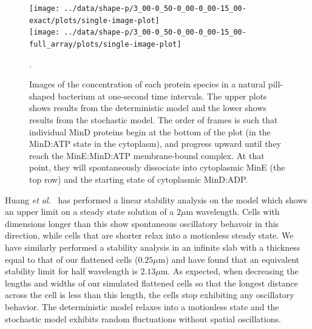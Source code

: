 \documentclass[letterpaper,twocolumn,amsmath,amssymb,pre]{revtex4-1}
\newcommand{\red}[1]{{\bf \color{red} #1}}
\newcommand{\fixme}[1]{\red{[#1]}}
\newcommand\micron{\ensuremath{\mu\text{m}}}
\begin{document}

\begin{figure}
  \begin{center}
    \texttt{[image: ../data/shape-p/3\_00-0\_50-0\_00-0\_00-15\_00-exact/plots/single-image-plot]}\\
    \vspace{-2.5em}
    \texttt{[image: ../data/shape-p/3\_00-0\_50-0\_00-0\_00-15\_00-full\_array/plots/single-image-plot]}
    \vspace{-3em}
  \end{center}
  \caption{Images of the concentration of each protein species in a
    natural pill-shaped bacterium at one-second time intervals. The
    upper plots shows results from the deterministic model and the
    lower shows results from the stochastic model.  The order of
    frames is such that individual MinD proteins begin at the bottom
    of the plot (in the MinD:ATP state in the cytoplasm), and progress
    upward until they reach the MinE:MinD:ATP membrane-bound complex.
    At that point, they will spontaneously dissociate into cytoplasmic
    MinE (the top row) and the starting state of cytoplasmic
    MinD:ADP.}.
  \label{image-p}
\end{figure}

Huang \emph{et al.}~\cite{huang2003dynamic} has performed a linear
stability analysis on the model which shows an upper limit on a steady
state solution of a $2\micron$ wavelength.  Cells with dimensions longer
than this show spontaneous oscillatory behavoir in this
direction, while cells that are shorter relax into a motionless steady
state.  We have similarly performed a stability analysis in an
infinite slab with a thickness equal to that of our flattened cells
($0.25\micron$) and have found that an equivalent stability limit for
half wavelength is $2.13\micron$. As expected, when decreasing the
lengths and widths of our simulated flattened cells so that the
longest distance across the cell is less than this length, the cells
stop exhibiting any oscillatory behavior.  The deterministic model
relaxes into a motionless state and the stochastic model exhibits
random fluctuations without spatial oscillations.
\end{document}
